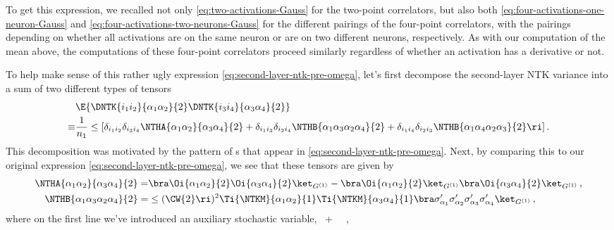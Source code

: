 To get this expression, we recalled not only \eqref{eq:two-activations-Gauss} for the two-point correlators, 
but also both \eqref{eq:four-activations-one-neuron-Gauss} and \eqref{eq:four-activations-two-neurons-Gauss} for the different pairings of the four-point correlators, with the pairings depending on whether all activations are on the same neuron or are on two different neurons, respectively.
As with our computation of the mean above,
the computations of these four-point correlators proceed similarly regardless of whether an activation has a derivative or not.



To help make sense of this rather ugly expression \eqref{eq:second-layer-ntk-pre-omega}, let's first decompose the second-layer NTK variance into a sum of two different types of tensors
\begin{align}\label{eq:NTH-variance-decomposition-second}\index{tensor decomposition!NTK variance $A$/$B$}
&\E{\DNTK{i_1i_2}{\alpha_1\alpha_2}{2}\DNTK{i_3i_4}{\alpha_3\alpha_4}{2}}\, \\
\equiv&\frac{1}{n_1}\le[\delta_{i_1i_2}\delta_{i_3i_4} \NTHA{\alpha_1\alpha_2}{\alpha_3\alpha_4}{2}+\delta_{i_1i_3}\delta_{i_2i_4}\NTHB{\alpha_1\alpha_3\alpha_2\alpha_4}{2}+\delta_{i_1i_4}\delta_{i_2i_3}\NTHB{\alpha_1\alpha_4\alpha_2\alpha_3}{2}\ri]\, . \nonumber
\end{align}
This decomposition was motivated by the pattern of s that appear in \eqref{eq:second-layer-ntk-pre-omega}. Next, by comparing this 
to our original expression \eqref{eq:second-layer-ntk-pre-omega}, we 
see that these tensors are given by 
\begin{align}
\NTHA{\alpha_1\alpha_2}{\alpha_3\alpha_4}{2}=& \bra \Oi{\alpha_1\alpha_2}{2} \Oi{\alpha_3\alpha_4}{2} \ket_{G^{(1)}}-\bra \Oi{\alpha_1\alpha_2}{2}\ket_{G^{(1)}}\bra \Oi{\alpha_3\alpha_4}{2} \ket_{G^{(1)}}\, ,\label{eq:A-recursion-second}\\
\NTHB{\alpha_1\alpha_3\alpha_2\alpha_4}{2}=& \le(\CW{2}\ri)^2\Ti{\NTKM}{\alpha_1\alpha_2}{1}\Ti{\NTKM}{\alpha_3\alpha_4}{1}\bra\sigma^{\prime}_{\alpha_1}\sigma^{\prime}_{\alpha_2}\sigma^{\prime}_{\alpha_3}\sigma^{\prime}_{\alpha_4}\ket_{G^{(1)}}\, ,\label{eq:B-recursion-second}
\end{align}
where on the first line we've introduced an auxiliary stochastic variable,
\be\label{eq:def-omega-without-neural-second}
 \equiv {} \,   + \,    \, ,
